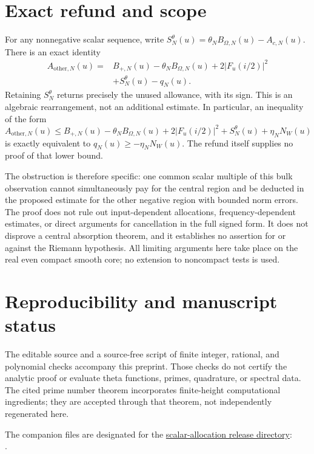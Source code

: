 \documentclass[11pt]{article}
\theoremstyle{remark}
\newcommand{\NW}{N_W}
\numberwithin{equation}{section}
\begin{document}
\clearpage
\section{Exact refund and scope}\label{sec:scope}
For any nonnegative scalar sequence, write
$S_N^\theta(u)=\theta_NB_{\Omega,N}(u)-A_{c,N}(u)$.
There is an exact identity
\begin{equation}\label{eq:refund}
 \begin{split}
 A_{\mathrm{other},N}(u)
 ={}&B_{+,N}(u)-\theta_NB_{\Omega,N}(u)+2|F_u(i/2)|^2\\
    &+S_N^\theta(u)-q_N(u).
 \end{split}
\end{equation}
Retaining $S_N^\theta$ returns precisely the unused allowance, with its sign. This is an algebraic rearrangement, not an additional estimate. In particular, an inequality of the form
\[
 A_{\mathrm{other},N}(u)\le
 B_{+,N}(u)-\theta_NB_{\Omega,N}(u)+2|F_u(i/2)|^2
       +S_N^\theta(u)+\eta_N\NW(u)
\]
is exactly equivalent to $q_N(u)\ge-\eta_N\NW(u)$. The refund itself supplies no proof of that lower bound.

The obstruction is therefore specific: one common scalar multiple of this bulk observation cannot simultaneously pay for the central region and be deducted in the proposed estimate for the other negative region with bounded norm errors. The proof does not rule out input-dependent allocations, frequency-dependent estimates, or direct arguments for cancellation in the full signed form. It does not disprove a central absorption theorem, and it establishes no assertion for or against the Riemann hypothesis. All limiting arguments here take place on the real even compact smooth core; no extension to noncompact tests is used.

\section*{Reproducibility and manuscript status}
The editable source and a source-free script of finite integer, rational, and polynomial checks accompany this preprint. Those checks do not certify the analytic proof or evaluate theta functions, primes, quadrature, or spectral data. The cited prime number theorem incorporates finite-height computational ingredients; they are accepted through that theorem, not independently regenerated here.

The companion files are designated for the
\href{https://github.com/serabing-hash/theta-weighted-certificate/tree/main/research/2026-10-27-scalar-bulk-allocation}{scalar-allocation release directory}:\\
.
\end{document}
